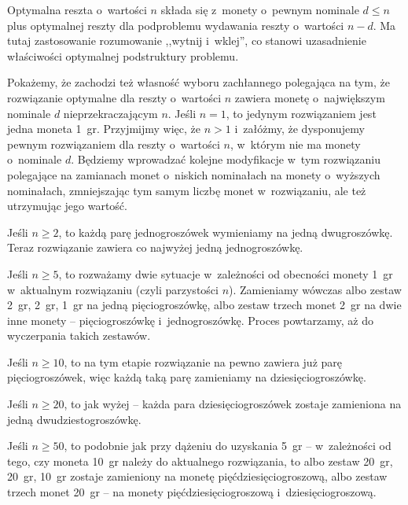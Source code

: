 
\subproblem %
Optymalna reszta o~wartości $n$ składa się z~monety o~pewnym nominale $d\le n$ plus optymalnej reszty dla podproblemu wydawania reszty o~wartości $n-d$.
Ma tutaj zastosowanie rozumowanie ,,wytnij i~wklej'', co stanowi uzasadnienie właściwości optymalnej podstruktury problemu.

Pokażemy, że zachodzi też własność wyboru zachłannego polegająca na tym, że rozwiązanie optymalne dla reszty o~wartości $n$ zawiera monetę o~największym nominale $d$ nieprzekraczającym $n$.
Jeśli $n=1$, to jedynym rozwiązaniem jest jedna moneta 1~gr.
Przyjmijmy więc, że $n>1$ i~załóżmy, że dysponujemy pewnym rozwiązaniem dla reszty o~wartości $n$, w~którym nie ma monety o~nominale $d$.
Będziemy wprowadzać kolejne modyfikacje w~tym rozwiązaniu polegające na zamianach monet o~niskich nominałach na monety o~wyższych nominałach, zmniejszając tym samym liczbę monet w~rozwiązaniu, ale też utrzymując jego wartość.

Jeśli $n\ge2$, to każdą parę jednogroszówek wymieniamy na jedną dwugroszówkę.
Teraz rozwiązanie zawiera co najwyżej jedną jednogroszówkę.

Jeśli $n\ge5$, to rozważamy dwie sytuacje w~zależności od obecności monety 1~gr w~aktualnym rozwiązaniu (czyli parzystości $n$).
Zamieniamy wówczas albo zestaw 2~gr, 2~gr, 1~gr na jedną pięciogroszówkę, albo zestaw trzech monet 2~gr na dwie inne monety -- pięciogroszówkę i~jednogroszówkę.
Proces powtarzamy, aż do wyczerpania takich zestawów.

Jeśli $n\ge10$, to na tym etapie rozwiązanie na pewno zawiera już parę pięciogroszówek, więc każdą taką parę zamieniamy na dziesięciogroszówkę.

Jeśli $n\ge20$, to jak wyżej -- każda para dziesięciogroszówek zostaje zamieniona na jedną dwudziestogroszówkę.

Jeśli $n\ge50$, to podobnie jak przy dążeniu do uzyskania 5~gr -- w~zależności od tego, czy moneta 10~gr należy do aktualnego rozwiązania, to albo zestaw 20~gr, 20~gr, 10~gr zostaje zamieniony na monetę pięćdziesięciogroszową, albo zestaw trzech monet 20~gr -- na monety pięćdziesięciogroszową i~dziesięciogroszową.

